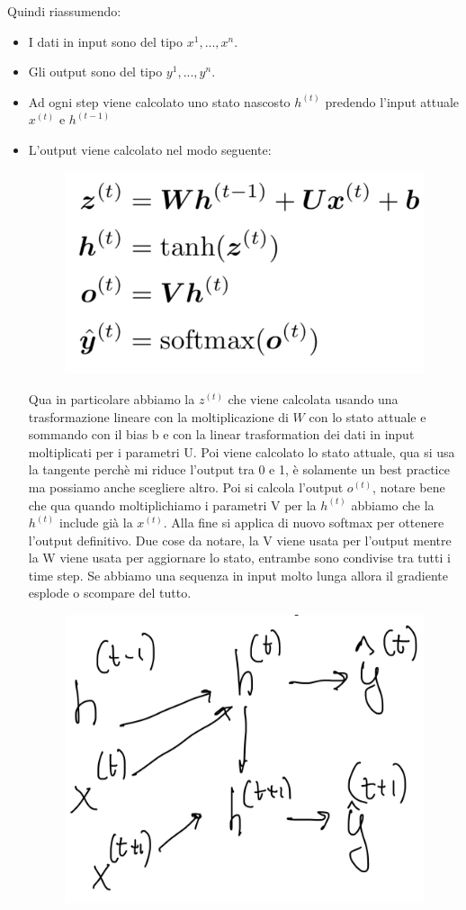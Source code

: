 \documentclass[14pt]{extreport}
\begin{document}
Quindi riassumendo:

\begin{itemize}
	\item I dati in input sono del tipo $x^{1},...,x^{n}$.
	\item Gli output sono del tipo $y^{1},..., y^{n}$.
	\item Ad ogni step viene calcolato uno stato nascosto $h^{(t)}$ predendo l'input attuale $x^{(t)}$ e $h^{(t-1)}$
	\item L'output viene calcolato nel modo seguente:
	\begin{figure}[H]
		\centering
		\includegraphics[width=0.7\linewidth]{417.jpeg}
		\end{figure}
	Qua in particolare abbiamo la $z^{(t)}$ che viene calcolata usando una trasformazione lineare con la moltiplicazione di $W$ con lo stato attuale e sommando con il bias b e con la linear trasformation dei dati in input moltiplicati per i parametri U.
	Poi viene calcolato lo stato attuale, qua si usa la tangente perchè mi riduce l'output tra 0 e 1, è solamente un best practice ma possiamo anche scegliere altro.
	Poi si calcola l'output $o^{(t)}$, notare bene che qua quando moltiplichiamo i parametri V per la $h^{(t)}$ abbiamo che la $h^{(t)}$ include già la $x^{(t)}$.
	Alla fine si applica di nuovo softmax per ottenere l'output definitivo.
	Due cose da notare, la V viene usata per l'output mentre la W viene usata per aggiornare lo stato, entrambe sono condivise tra tutti i time step.
	Se abbiamo una sequenza in input molto lunga allora il gradiente esplode o scompare del tutto.
	\begin{figure}[H]
	\centering
	\includegraphics[width=0.7\linewidth]{418.jpeg}
	\end{figure}
\end{itemize}
\end{document}
